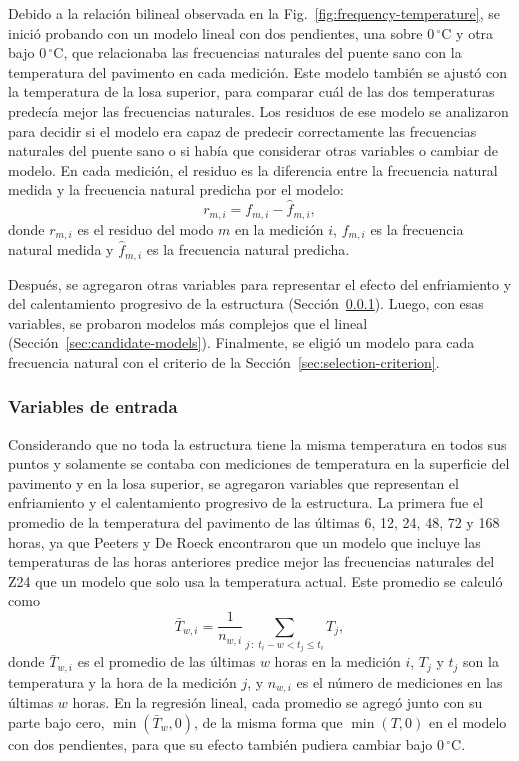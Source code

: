 \documentclass[9pt,twocolumn,twoside]{opticajnl}
\begin{document}
Debido a la relación bilineal observada en la Fig.~\ref{fig:frequency-temperature}, se inició probando con un modelo lineal con dos pendientes, una sobre $0\,^\circ$C y otra bajo $0\,^\circ$C, que relacionaba las frecuencias naturales del puente sano con la temperatura del pavimento en cada medición. Este modelo también se ajustó con la temperatura de la losa superior, para comparar cuál de las dos temperaturas predecía mejor las frecuencias naturales. Los residuos de ese modelo se analizaron para decidir si el modelo era capaz de predecir correctamente las frecuencias naturales del puente sano o si había que considerar otras variables o cambiar de modelo. En cada medición, el residuo es la diferencia entre la frecuencia natural medida y la frecuencia natural predicha por el modelo:
\begin{equation}
r_{m,i} = f_{m,i} - \hat{f}_{m,i},
\label{eq:residual}
\end{equation}
donde $r_{m,i}$ es el residuo del modo $m$ en la medición $i$, $f_{m,i}$ es la frecuencia natural medida y $\hat{f}_{m,i}$ es la frecuencia natural predicha.

Después, se agregaron otras variables para representar el efecto del enfriamiento y del calentamiento progresivo de la estructura (Sección~\ref{sec:input-variables}). Luego, con esas variables, se probaron modelos más complejos que el lineal (Sección~\ref{sec:candidate-models}). Finalmente, se eligió un modelo para cada frecuencia natural con el criterio de la Sección~\ref{sec:selection-criterion}.

\subsubsection{Variables de entrada}
\label{sec:input-variables}

Considerando que no toda la estructura tiene la misma temperatura en todos sus puntos y solamente se contaba con mediciones de temperatura en la superficie del pavimento y en la losa superior, se agregaron variables que representan el enfriamiento y el calentamiento progresivo de la estructura. La primera fue el promedio de la temperatura del pavimento de las últimas 6, 12, 24, 48, 72 y 168 horas, ya que Peeters y De Roeck \cite{Peeters2001} encontraron que un modelo que incluye las temperaturas de las horas anteriores predice mejor las frecuencias naturales del Z24 que un modelo que solo usa la temperatura actual. Este promedio se calculó como
\begin{equation}
\bar{T}_{w,i} = \frac{1}{n_{w,i}} \sum_{j\,:\; t_i - w < t_j \le t_i} T_j,
\label{eq:moving-average}
\end{equation}
donde $\bar{T}_{w,i}$ es el promedio de las últimas $w$ horas en la medición $i$, $T_j$ y $t_j$ son la temperatura y la hora de la medición $j$, y $n_{w,i}$ es el número de mediciones en las últimas $w$ horas. En la regresión lineal, cada promedio se agregó junto con su parte bajo cero, $\min(\bar{T}_w,0)$, de la misma forma que $\min(T,0)$ en el modelo con dos pendientes, para que su efecto también pudiera cambiar bajo $0\,^\circ$C.
\end{document}
